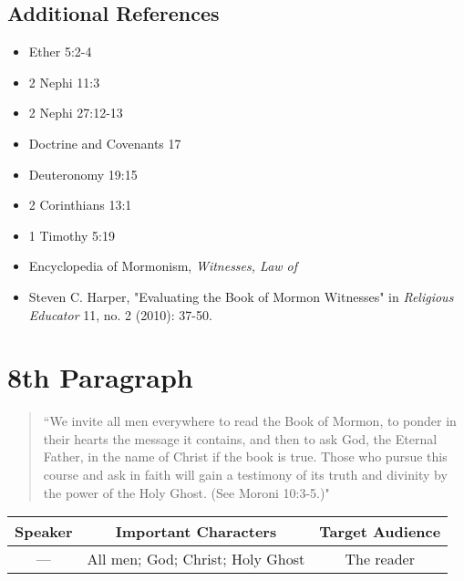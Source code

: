 \documentclass[12pt]{report}
\begin{document}
\subsection{Additional References\label{intro:references7}}
\begin{itemize}
\item Ether 5:2-4
\item 2 Nephi 11:3
\item 2 Nephi 27:12-13
\item Doctrine and Covenants 17
\item Deuteronomy 19:15
\item 2 Corinthians 13:1
\item 1 Timothy 5:19
\item Encyclopedia of Mormonism, \emph{Witnesses, Law of}
\item Steven C. Harper, "Evaluating the Book of Mormon Witnesses" in \emph{Religious Educator} 11, no. 2 (2010): 37-50.
\end{itemize}

\section{8th Paragraph\label{intro:8th}}
\begin{center}
\begin{quote}
``We invite all men everywhere to read the Book of Mormon, to ponder in their hearts the message it contains, and then to ask God, the Eternal Father, in the name of Christ if the book is true.  Those who pursue this course and ask in faith will gain a testimony of its truth and divinity by the power of the Holy Ghost. (See Moroni 10:3-5.)"
\end{quote}
\end{center}

\begin{table}[h!]
\centering
\label{table:intro8}
\begin{tabular*}{\textwidth}{c @{\extracolsep{\fill}}cc}
Speaker & Important Characters & Target Audience \\
\hline
\rule{0pt}{3ex}--- & All men; God; Christ; Holy Ghost & The reader 
\end{tabular*}
\end{table}
\end{document}
